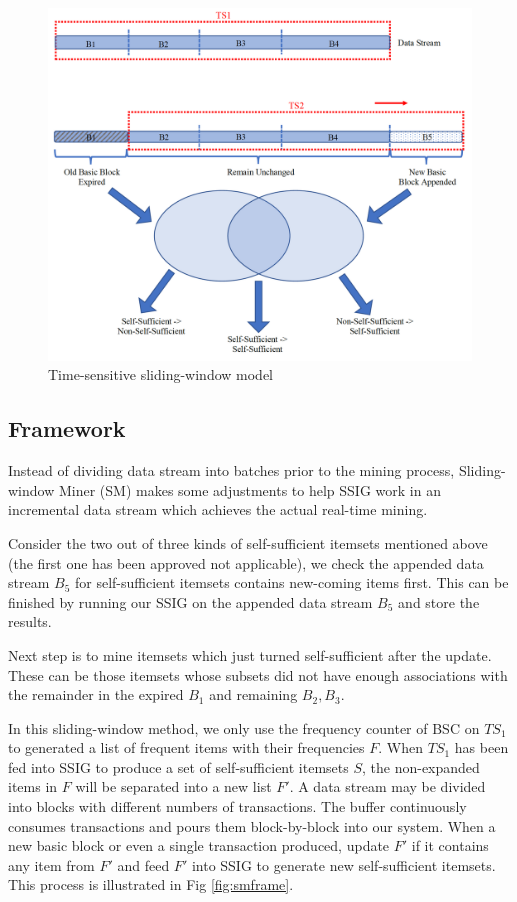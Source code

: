 \begin{figure}[H]
\caption{Time-sensitive sliding-window model}
\label{fig:fsl}
\centering
\includegraphics[scale=0.45]{Methodology/TSL.png}
\end{figure}

\subsection{Framework}
Instead of dividing data stream into batches prior to the mining process, Sliding-window Miner (SM) makes some adjustments to help SSIG work in an incremental data stream which achieves the actual real-time mining. 

Consider the two out of three kinds of self-sufficient itemsets mentioned above (the first one has been approved not applicable), we check the appended data stream $B_5$ for self-sufficient itemsets contains new-coming items first. This can be finished by running our SSIG on the appended data stream $B_5$ and store the results.

Next step is to mine itemsets which just turned self-sufficient after the update. These can be those itemsets whose subsets did not have enough associations with the remainder in the expired $B_1$ and remaining $B_2, B_3$. 

In this sliding-window method, we only use the frequency counter of BSC on $TS_1$ to generated a list of frequent items with their frequencies $F$. When $TS_1$ has been fed into SSIG to produce a set of self-sufficient itemsets $S$, the non-expanded items in $F$ will be separated into a new list $F'$. A data stream may be divided into blocks with different numbers of transactions. The buffer continuously consumes transactions and pours them block-by-block into our system. When a new basic block or even a single transaction produced, update $F'$ if it contains any item from $F'$ and feed $F'$ into SSIG to generate new self-sufficient itemsets. This process is illustrated in Fig \ref{fig:smframe}.


